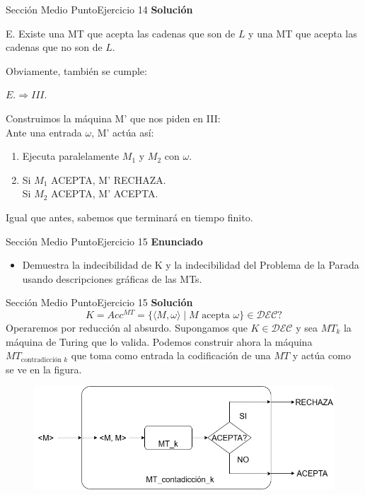 \documentclass[10pt, envcountsect, presentation, aspectratio=169]{beamer}
\begin{document}
\begin{frame}{Sección Medio Punto}{Ejercicio 14}
    \textbf{Solución}\\
     \begin{center}
        E. Existe una MT que acepta las cadenas que son de $L$ y una MT que acepta las cadenas que no son de $L$.   
    \end{center}
    Obviamente, también se cumple: 
    \begin{center}
        $E. \Rightarrow III.$
    \end{center}
    Construimos la máquina M' que nos piden en III:\\
    Ante una entrada $\omega$, M' actúa así:
    \begin{enumerate}[1.] 
        \item Ejecuta paralelamente $M_1$ y $M_2$ con $\omega$. 
        \item   Si $M_1$ ACEPTA, M' RECHAZA.\\
                Si $M_2$ ACEPTA, M' ACEPTA.
    \end{enumerate}

    \vspace{3mm}
    Igual que antes, sabemos que terminará en tiempo finito.
    
\end{frame}

\begin{frame}{Sección Medio Punto}{Ejercicio 15}
    \textbf{Enunciado}
    \begin{itemize}
        \item Demuestra la indecibilidad de K y la indecibilidad del Problema de la Parada usando descripciones gráficas de las MTs.
    \end{itemize}
\end{frame}


\begin{frame}{Sección Medio Punto}{Ejercicio 15}
    \textbf{Solución}\\
    $$
    K=Acc^{MT}=\{ \langle M, \omega \rangle \mid M \text{ acepta } \omega \} \in \mathcal{DEC} \text{?}
    $$
    Operaremos por reducción al absurdo. Supongamos que $K\in\mathcal{DEC}$ y sea $MT_k$ la máquina de Turing que lo valida. Podemos construir ahora la máquina $MT_{\text{contradicción }k}$ que toma como entrada la codificación de una $MT$ y actúa como se ve en la figura.
    \begin{figure}
        \includegraphics[scale=0.4]{images/contradiccion_k.png}
    \end{figure}
\end{frame}
\end{document}
